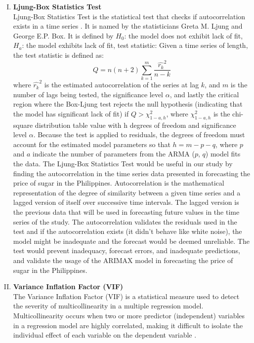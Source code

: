 \documentclass[11pt]{article}
\begin{document}
\begin{enumerate}[I. ]
    \item \textbf{Ljung-Box Statistics Test}\\
    Ljung-Box Statistics Test is the statistical test that checks if autocorrelation exists in a time series \citep{ljung}. It is named by the statisticians Greta M. Ljung and George E.P. Box. It is defined by $H_{0}$: the model does not exhibit lack of fit, $H_{a}$: the model exhibits lack of fit, test statistic: Given a time series of length, the test statistic is defined as: 
    $$
        Q = n (n + 2) \sum_{k=1}^{m} \frac{\hat{r_{k}}^{2}}{n - k}  
    $$
    where $\hat{r_{k}}^{2}$ is the estimated autocorrelation of the series at lag $k$, and $m$ is the number of lags being tested, the significance level $\alpha$, and lastly the critical region where the Box-Ljung test rejects the null hypothesis (indicating that the model has significant lack of fit) if $Q > \chi^{2}_{1 -a,h}$, where $\chi^{2}_{1 - a,h}$ is the chi-square distribution table value with h degrees of freedom and significance level $\alpha$. Because the test is applied to residuals, the degrees of freedom must account for the estimated model parameters so that $h=m-p-q$, where $p$ and $a$ indicate the number of parameters from the ARMA ($p$, $q$) model fits the data. The Ljung-Box Statistics Test would be useful in our study by finding the autocorrelation in the time series data presented in forecasting the price of sugar in the Philippines. Autocorrelation is the mathematical representation of the degree of similarity between a given time series and a lagged version of itself over successive time intervals. The lagged version is the previous data that will be used in forecasting future values in the time series of the study. The autocorrelation validates the residuals used in the test and if the autocorrelation exists (it didn’t behave like white noise), the model might be inadequate and the forecast would be deemed unreliable. The test would prevent inadequacy, forecast errors, and inadequate predictions, and validate the usage of the ARIMAX model in forecasting the price of sugar in the Philippines.

    \item \textbf{Variance Inflation Factor (VIF)}\\
    The Variance Inflation Factor (VIF) is a statistical measure used to detect the severity of multicollinearity in a multiple regression model. Multicollinearity occurs when two or more predictor (independent) variables in a regression model are highly correlated, making it difficult to isolate the individual effect of each variable on the dependent variable \citep{vif1}.


\end{enumerate}
\end{document}
